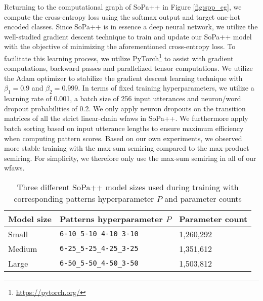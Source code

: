 Returning to the computational graph of SoPa++ in Figure \ref{fig:spp_cg}, we
compute the cross-entropy loss using the softmax output and target one-hot
encoded classes. Since SoPa++ is in essence a deep neural network, we utilize
the well-studied gradient descent technique to train and update our SoPa++ model
with the objective of minimizing the aforementioned cross-entropy loss. To
facilitate this learning process, we utilize
PyTorch\footnote{\url{https://pytorch.org/}} to assist with gradient computations,
backward passes and parallelized tensor computations. We utilize the Adam
optimizer \citep{DBLP:journals/corr/KingmaB14} to stabilize the gradient descent
learning technique with $\beta_1=0.9$ and $\beta_2=0.999$. In terms of fixed
training hyperparameters, we utilize a learning rate of 0.001, a batch size of
256 input utterances and neuron/word dropout probabilities of 0.2. We only apply
neuron dropouts on the transition matrices of all the strict linear-chain
\ac{wfaws} in SoPa++. We furthermore apply batch sorting based on input
utterance lengths to ensure maximum efficiency when computing pattern
scores. Based on our own experiments, we observed more stable training with the
max-sum semiring compared to the max-product semiring. For simplicity, we
therefore only use the max-sum semiring in all of our \ac{wfaws}.

\begin{table}[t!]
  \centering
  \begin{tabular}{lll}
    \toprule
    Model size & Patterns hyperparameter $P$ & Parameter count \\
    \midrule
    Small & \texttt{6-10\_5-10\_4-10\_3-10} & 1,260,292 \\
    Medium & \texttt{6-25\_5-25\_4-25\_3-25} & 1,351,612  \\
    Large & \texttt{6-50\_5-50\_4-50\_3-50} & 1,503,812 \\
    \bottomrule
  \end{tabular}
  \caption{Three different SoPa++ model sizes used during training with
    corresponding patterns hyperparameter $P$ and parameter counts}
  \label{tab:model_types}
\end{table}

